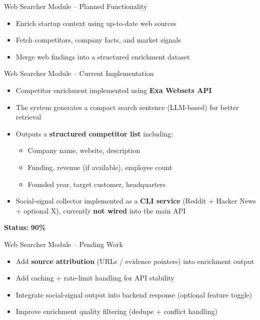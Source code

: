 \documentclass{beamer}
\begin{document}
\begin{frame}{Web Searcher Module – Planned Functionality}
\begin{itemize}
    \item Enrich startup context using up-to-date web sources
    \item Fetch competitors, company facts, and market signals
    \item Merge web findings into a structured enrichment dataset
\end{itemize}
\end{frame}

\begin{frame}{Web Searcher Module – Current Implementation}
\begin{itemize}
    \item Competitor enrichment implemented using \textbf{Exa Websets API}
    \item The system generates a compact search sentence (LLM-based) for better retrieval
    \item Outputs a \textbf{structured competitor list} including:
    \begin{itemize}
        \item Company name, website, description
        \item Funding, revenue (if available), employee count
        \item Founded year, target customer, headquarters
    \end{itemize}
    \item Social-signal collector implemented as a \textbf{CLI service} (Reddit + Hacker News + optional X), currently \textbf{not wired} into the main API
\end{itemize}

\vspace{0.4em}
\textbf{Status:} \textbf{90\%}
\end{frame}

\begin{frame}{Web Searcher Module – Pending Work}
\begin{itemize}
    \item Add \textbf{source attribution} (URLs / evidence pointers) into enrichment output
    \item Add caching + rate-limit handling for API stability
    \item Integrate social-signal output into backend response (optional feature toggle)
    \item Improve enrichment quality filtering (dedupe + conflict handling)
\end{itemize}
\end{frame}
\end{document}
